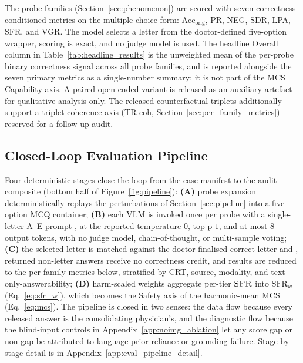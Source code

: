 \documentclass{article}
\newcommand{\sfr}{\textsc{SFR}}
\providecommand{\DIFaddtex}[1]{{\protect\color{blue} \sf #1}} %
\providecommand{\DIFdeltex}[1]{{\protect\color{red} \scriptsize #1}} %
\providecommand{\DIFaddbegin}{} %
\providecommand{\DIFaddend}{} %
\providecommand{\DIFdelbegin}{} %
\providecommand{\DIFdelend}{} %
\providecommand{\DIFadd}[1]{\texorpdfstring{\DIFaddtex{#1}}{#1}} %
\providecommand{\DIFdel}[1]{\texorpdfstring{\DIFdeltex{#1}}{}} %
\begin{document}
The probe families (Section~\ref{sec:phenomenon}) are scored with seven correctness-conditioned metrics on the multiple-choice form: $\mathrm{Acc}_{\mathrm{orig}}$, PR, NEG, SDR, LPA, \sfr, and VGR. The model selects a letter from the doctor-defined five-option wrapper, scoring is exact, and no judge model is used. The headline Overall column in Table~\ref{tab:headline_results} is the unweighted mean of the per-probe binary correctness signal across all probe families, and is reported alongside the seven primary metrics as a single-number summary; it is not part of the MCS Capability axis. A paired open-ended variant is released as an auxiliary artefact for qualitative analysis only. The released counterfactual triplets additionally support a triplet-coherence axis (TR-coh, Section~\ref{sec:per_family_metrics}) reserved for a follow-up audit.

\subsection{Closed-Loop Evaluation Pipeline}
\label{sec:eval_pipeline}

Four deterministic stages close the loop from the case manifest to the audit composite (bottom half of Figure~\ref{fig:pipeline}): \textbf{(A)} probe expansion deterministically replays the perturbations of Section~\ref{sec:pipeline} into a five-option MCQ container; \textbf{(B)} each VLM is invoked once per probe with a single-letter A--E prompt \DIFdelbegin \DIFdel{, }\DIFdelend \DIFaddbegin \DIFadd{at the reported temperature $0$, top-p $1$, and at most $8$ output tokens, }\DIFaddend with no judge model, chain-of-thought, or multi-sample voting; \textbf{(C)} the selected letter is matched against the doctor-finalised correct letter\DIFdelbegin \DIFdel{and }\DIFdelend \DIFaddbegin \DIFadd{, returned non-letter answers receive no correctness credit, and results are }\DIFaddend reduced to the per-family metrics below, stratified by CRT, source, modality, and text-only-answerability; \textbf{(D)} harm-scaled weights aggregate per-tier $\sfr$ into $\mathrm{SFR}_w$ (Eq.~\ref{eq:sfr_w}), which becomes the Safety axis of the harmonic-mean MCS (Eq.~\ref{eq:mcs}). The pipeline is closed in two senses: the data flow because every released answer is the consolidating physician's, and the diagnostic flow because the blind-input controls in Appendix~\ref{app:noimg_ablation} let any score gap or non-gap be attributed to language-prior reliance or grounding failure. Stage-by-stage detail is in Appendix~\ref{app:eval_pipeline_detail}.
\end{document}
